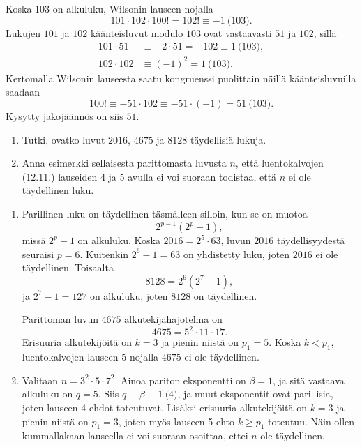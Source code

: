 \documentclass[11pt,a4paper]{amsart}
\begin{document}
\begin{solution}
  Koska \(103\) on alkuluku, Wilsonin lauseen nojalla
  \[
    101\cdot 102\cdot 100!=102!\equiv -1\pod{103}.
  \]
  Lukujen \(101\) ja \(102\) käänteisluvut modulo \(103\) ovat
  vastaavasti \(51\) ja \(102\), sillä
  \[
    \begin{aligned}
      101\cdot 51&\equiv -2\cdot 51=-102\equiv 1\pod{103},\\
      102\cdot 102&\equiv (-1)^2=1\pod{103}.
    \end{aligned}
  \]
  Kertomalla Wilsonin lauseesta saatu kongruenssi puolittain näillä
  käänteisluvuilla saadaan
  \[
    100!\equiv -51\cdot 102\equiv -51\cdot(-1)=51\pod{103}.
  \]
  Kysytty jakojäännös on siis \(51\).
\end{solution}

\begin{exercise}
  \leavevmode\par
  \begin{enumerate}[label=(\alph*), nosep]
    \item Tutki, ovatko luvut \(2016\), \(4675\) ja \(8128\) täydellisiä
      lukuja.
    \item Anna esimerkki sellaisesta parittomasta luvusta \(n\), että
      luentokalvojen (12.11.) lauseiden 4 ja 5 avulla ei voi suoraan
      todistaa, että \(n\) ei ole täydellinen luku.
  \end{enumerate}
\end{exercise}

\begin{solution}
  \leavevmode\par
  \begin{enumerate}[label=(\alph*), nosep]
    \item Parillinen luku on täydellinen täsmälleen silloin, kun se on muotoa
      \[
        2^{p-1}(2^p-1),
      \]
      missä \(2^p-1\) on alkuluku. Koska \(2016=2^5\cdot 63\),
      luvun \(2016\) täydellisyydestä seuraisi \(p=6\). Kuitenkin
      \(2^6-1=63\) on yhdistetty luku, joten \(2016\) ei ole täydellinen.
      Toisaalta
      \[
        8128=2^6(2^7-1),
      \]
      ja \(2^7-1=127\) on alkuluku, joten \(8128\) on täydellinen.

      Parittoman luvun \(4675\) alkutekijähajotelma on
      \[
        4675=5^2\cdot 11\cdot 17.
      \]
      Erisuuria alkutekijöitä on \(k=3\) ja pienin niistä on \(p_1=5\).
      Koska \(k<p_1\), luentokalvojen lauseen 5 nojalla \(4675\) ei ole
      täydellinen.
    \item Valitaan \(n=3^2\cdot 5\cdot 7^2\). Ainoa pariton eksponentti
      on \(\beta=1\), ja sitä vastaava alkuluku on \(q=5\).
      Siis \(q\equiv\beta\equiv 1\pod{4}\), ja muut eksponentit ovat
      parillisia, joten lauseen 4 ehdot toteutuvat. Lisäksi erisuuria
      alkutekijöitä on \(k=3\) ja pienin niistä on \(p_1=3\), joten myös
      lauseen 5 ehto \(k\geq p_1\) toteutuu. Näin ollen kummallakaan
      lauseella ei voi suoraan osoittaa, ettei \(n\) ole täydellinen.
  \end{enumerate}
\end{solution}
\end{document}
